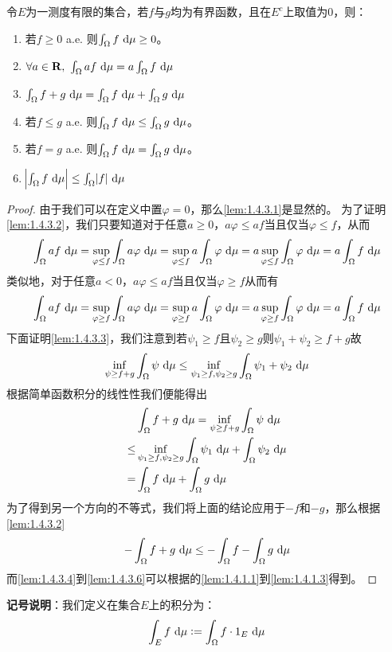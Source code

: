\documentclass[../main.tex]{subfiles}
\begin{document}
\begin{lemma}\label{lem:1.4.3}
令\(E\)为一测度有限的集合，若\(f\)与\(g\)均为有界函数，且在\(E^c\)上取值为\(0\)，则：
\begin{enumerate}
	\item \label{lem:1.4.3.1} 若\(f\geq0\) a.e. 则\(\int_\Omega f\,\dif\mu\geq0\)。
	\item \label{lem:1.4.3.2} \(\forall a\in\R,\ \int_\Omega af\,\dif\mu=a\int_\Omega f\,\dif\mu\)
	\item \label{lem:1.4.3.3} \(\int_\Omega f+g\,\dif\mu=\int_\Omega f\,\dif\mu+\int_\Omega g\,\dif\mu\)
	\item \label{lem:1.4.3.4} 若\(f\leq g\) a.e. 则\(\int_\Omega f\,\dif\mu\leq\int_\Omega g\,\dif\mu\)。
	\item \label{lem:1.4.3.5} 若\(f=g\) a.e. 则\(\int_\Omega f\,\dif\mu=\int_\Omega g\,\dif\mu\)。
	\item \label{lem:1.4.3.6} \(\envert{\int_\Omega f\,\dif\mu}\leq\int_\Omega \envert{f}\,\dif\mu\)
\end{enumerate}
\end{lemma}
\begin{proof}
由于我们可以在定义中置\(\varphi=0\)，那么\ref{lem:1.4.3.1}是显然的。
为了证明\ref{lem:1.4.3.2}，我们只要知道对于任意\(a\geq0\)，\(a\varphi\leq af\)当且仅当\(\varphi\leq f\)，从而
\[\int_\Omega af\,\dif\mu=\sup_{\varphi\leq f}\int_\Omega a\varphi\,\dif\mu=\sup_{\varphi\leq f}a\int_\Omega \varphi\,\dif\mu=a\sup_{\varphi\leq f}\int_\Omega \varphi\,\dif\mu=a\int_\Omega f\,\dif\mu\]
类似地，对于任意\(a<0\)，\(a\varphi\leq af\)当且仅当\(\varphi\geq f\)从而有
\[\int_\Omega af\,\dif\mu=\sup_{\varphi\geq f}\int_\Omega a\varphi\,\dif\mu=\sup_{\varphi\geq f}a\int_\Omega \varphi\,\dif\mu=a\sup_{\varphi\geq f}\int_\Omega \varphi\,\dif\mu=a\int_\Omega f\,\dif\mu\]
下面证明\ref{lem:1.4.3.3}，我们注意到若\(\psi_1\geq f\)且\(\psi_2\geq g\)则\(\psi_1+\psi_2\geq f+g\)故
\[\inf_{\psi\geq f+g}\int_\Omega \psi\,\dif\mu\leq\inf_{\psi_1\geq f, \psi_2\geq g}\int_\Omega \psi_1+\psi_2\,\dif\mu \]
根据简单函数积分的线性性我们便能得出
\begin{align*}
	&\int_\Omega f+g\,\dif\mu=\inf_{\psi\geq f+g}\int_\Omega \psi\,\dif\mu\\
	\leq&\inf_{\psi_1\geq f, \psi_2\geq g}\int_\Omega \psi_1\,\dif\mu+\int_\Omega\psi_2\,\dif\mu\\
	=&\int_\Omega f\,\dif\mu+\int_\Omega g\,\dif\mu
\end{align*}
为了得到另一个方向的不等式，我们将上面的结论应用于\(-f\)和\(-g\)，那么根据\ref{lem:1.4.3.2}
\[-\int_\Omega f+g\,\dif\mu\leq-\int_\Omega f-\int_\Omega g\,\dif\mu\]
而\ref{lem:1.4.3.4}到\ref{lem:1.4.3.6}可以根据的\ref{lem:1.4.1.1}到\ref{lem:1.4.1.3}得到。
\end{proof}
\textbf{记号说明}：我们定义在集合\(E\)上的积分为：
\[\int_Ef\,\dif\mu:=\int_\Omega f\cdot\indicator_{E}\,\dif\mu\]
\end{document}
